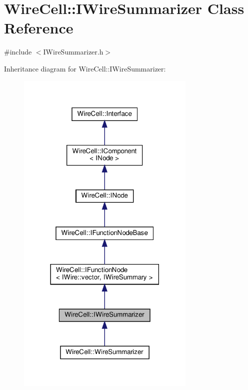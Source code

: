 \hypertarget{class_wire_cell_1_1_i_wire_summarizer}{}\section{Wire\+Cell\+:\+:I\+Wire\+Summarizer Class Reference}
\label{class_wire_cell_1_1_i_wire_summarizer}


{\ttfamily \#include $<$I\+Wire\+Summarizer.\+h$>$}



Inheritance diagram for Wire\+Cell\+:\+:I\+Wire\+Summarizer\+:
\nopagebreak
\begin{figure}[H]
\begin{center}
\leavevmode
\includegraphics[width=242pt]{class_wire_cell_1_1_i_wire_summarizer__inherit__graph}
\end{center}
\end{figure}


